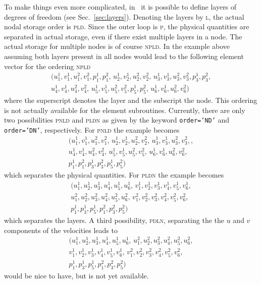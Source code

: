 To make things even more complicated, in \tfem\ it is possible to define layers
of degrees of freedom (see Sec.~\ref{sec:layers}). 
Denoting 
the layers by \textsc{l}, the actual nodal storage order is \textsc{pld}. Since
the outer loop is \textsc{p}, the physical quantities are separated in
actual storage, even if there exist multiple layers in a node. The actual
storage for multiple nodes is of course \textsc{npld}. In the example above
assuming both layers present in all nodes would lead to the following element
vector for the ordering \textsc{npld}
\begin{multline*}
   (u^1_1,v^1_1,u^2_1,v^2_1,p^1_1,p^2_1,\,
    u^1_2,v^1_2,u^2_2,v^2_2,\,
    u^1_3,v^1_3,u^2_3,v^2_3,p^1_3,p^2_3,\\
    u^1_4,v^1_4,u^2_4,v^2_4,\,
    u^1_5,v^1_5,u^2_5,v^2_5,p^1_5,p^2_5,\,
    u^1_6,v^1_6,u^2_6,v^2_6)
\end{multline*}
where the superscript denotes the layer and the subscript the node. This
ordering is not actually available for the element subroutines. Currently,
there are only two possibilities \textsc{pnld} and \textsc{pldn} as given by
the keyword \texttt{order='ND'} and \texttt{order='DN'}, respectively.
For \textsc{pnld} the example becomes
\begin{multline*}
   (u^1_1,v^1_1,u^2_1,v^2_1,\,
    u^1_2,v^1_2,u^2_2,v^2_2,\,
    u^1_3,v^1_3,u^2_3,v^2_3,,\\
    u^1_4,v^1_4,u^2_4,v^2_4,\,
    u^1_5,v^1_5,u^2_5,v^2_5,\,
    u^1_6,v^1_6,u^2_6,v^2_6,\,\\
    p^1_1,p^2_1,
    p^1_3,p^2_3,
    p^1_5,p^2_5)
\end{multline*}
which separates the physical quantities.
For \textsc{pldn} the example becomes
\begin{multline*}
   (u^1_1,u^1_2,u^1_3,u^1_4,u^1_5,u^1_6,\,
    v^1_1,v^1_2,v^1_3,v^1_4,v^1_5,v^1_6,\\
    u^2_1,u^2_2,u^2_3,u^2_4,u^2_5,u^2_6,\,
    v^2_1,v^2_2,v^2_3,v^2_4,v^2_5,v^2_6,\\
    p^1_1,p^1_3,p^1_5,
    p^2_1,p^2_3,p^2_5)
\end{multline*}
which separates the layers. A third possibility, \textsc{pdln}, separating the 
the $u$ and $v$ components of the velocities leads to
\begin{multline*}
   (u^1_1,u^1_2,u^1_3,u^1_4,u^1_5,u^1_6,\,
    u^2_1,u^2_2,u^2_3,u^2_4,u^2_5,u^2_6,\\
    v^1_1,v^1_2,v^1_3,v^1_4,v^1_5,v^1_6,\,
    v^2_1,v^2_2,v^2_3,v^2_4,v^2_5,v^2_6,\\
    p^1_1,p^1_3,p^1_5,
    p^2_1,p^2_3,p^2_5)
\end{multline*}
would be nice to have, but is not yet available.

